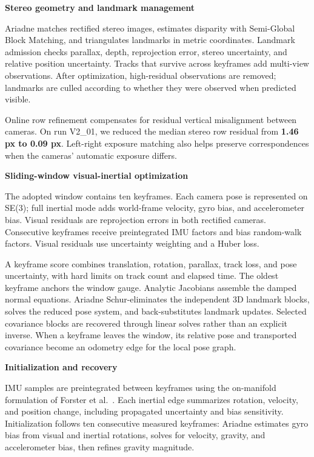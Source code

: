 \documentclass[10pt,a4paper]{article}
\newcommand{\indentedheading}[1]{\par\addvspace{0.65em}\noindent\hspace*{1em}\textbf{#1}\par\smallskip}
\begin{document}
\indentedheading{Stereo geometry and landmark management}

Ariadne matches rectified stereo images, estimates disparity with Semi-Global Block Matching, and triangulates landmarks in metric coordinates. Landmark admission checks parallax, depth, reprojection error, stereo uncertainty, and relative position uncertainty. Tracks that survive across keyframes add multi-view observations. After optimization, high-residual observations are removed; landmarks are culled according to whether they were observed when predicted visible.

Online row refinement compensates for residual vertical misalignment between cameras. On run V2\_01, we reduced the median stereo row residual from \textbf{1.46 px to 0.09 px}. Left-right exposure matching also helps preserve correspondences when the cameras' automatic exposure differs.

\indentedheading{Sliding-window visual-inertial optimization}

The adopted window contains ten keyframes. Each camera pose is represented on SE(3); full inertial mode adds world-frame velocity, gyro bias, and accelerometer bias. Visual residuals are reprojection errors in both rectified cameras. Consecutive keyframes receive preintegrated IMU factors and bias random-walk factors. Visual residuals use uncertainty weighting and a Huber loss.

A keyframe score combines translation, rotation, parallax, track loss, and pose uncertainty, with hard limits on track count and elapsed time. The oldest keyframe anchors the window gauge. Analytic Jacobians assemble the damped normal equations. Ariadne Schur-eliminates the independent 3D landmark blocks, solves the reduced pose system, and back-substitutes landmark updates. Selected covariance blocks are recovered through linear solves rather than an explicit inverse. When a keyframe leaves the window, its relative pose and transported covariance become an odometry edge for the local pose graph.

\indentedheading{Initialization and recovery}

IMU samples are preintegrated between keyframes using the on-manifold formulation of Forster et al.~\cite{forster}. Each inertial edge summarizes rotation, velocity, and position change, including propagated uncertainty and bias sensitivity. Initialization follows ten consecutive measured keyframes: Ariadne estimates gyro bias from visual and inertial rotations, solves for velocity, gravity, and accelerometer bias, then refines gravity magnitude.
\end{document}

